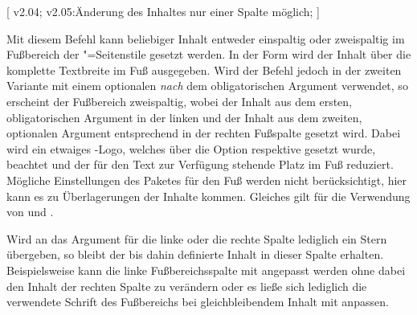 \begin{DeclareEntity*}{}
\begin{DeclareEntity*}{}
\begin{DeclareEntity*}{}
\begin{Declaration}
  {}
  [
    v2.04;
    v2.05:Änderung des Inhaltes nur einer Spalte möglich;
  ]
\begin{Declaration}
  {}
Mit diesem Befehl kann beliebiger Inhalt entweder einspaltig oder zweispaltig 
im Fußbereich der "=Seitenstile gesetzt werden. In der 
Form  wird der Inhalt über die komplette 
Textbreite im Fuß ausgegeben. Wird der Befehl jedoch in der zweiten Variante 
 mit einem 
optionalen \emph{nach} dem obligatorischen Argument verwendet, so erscheint der 
Fußbereich zweispaltig, wobei der Inhalt aus dem ersten, obligatorischen 
Argument in der linken und der Inhalt aus dem zweiten, optionalen Argument 
entsprechend in der rechten Fußspalte gesetzt wird. Dabei wird ein etwaiges 
\DDC-Logo, welches über die Option  respektive  
gesetzt wurde, beachtet und der für den Text zur Verfügung stehende Platz im 
Fuß reduziert. Mögliche Einstellungen des Paketes  
für den Fuß werden nicht berücksichtigt, hier kann es zu Überlagerungen der 
Inhalte kommen. Gleiches gilt für die Verwendung von  und 
.

%
Wird an das Argument für die linke oder die rechte Spalte lediglich ein Stern 
\PValue{*} übergeben, so bleibt der bis dahin definierte Inhalt in dieser 
Spalte erhalten. Beispielsweise kann die linke Fußbereichsspalte mit 
 angepasst werden ohne dabei den 
Inhalt der rechten Spalte zu verändern oder es ließe sich lediglich die 
verwendete Schrift des Fußbereichs bei gleichbleibendem Inhalt mit 
 anpassen.


\end{Declaration}
\end{Declaration}
\end{DeclareEntity*}
\end{DeclareEntity*}
\end{DeclareEntity*}
